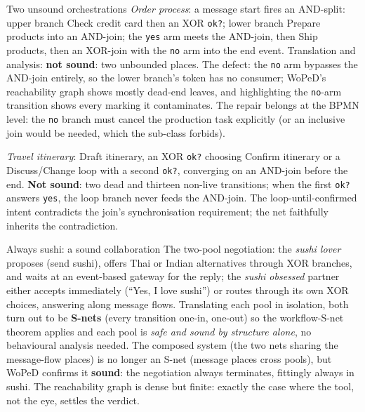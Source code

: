 \begin{examplebox}{Two unsound orchestrations}
\emph{Order process}: a message start fires an AND-split: upper branch \textsf{Check credit card} then an XOR \texttt{ok?}; lower branch \textsf{Prepare products} into an AND-join; the \texttt{yes} arm meets the AND-join, then \textsf{Ship products}, then an XOR-join with the \texttt{no} arm into the end event. Translation and analysis: \textbf{not sound}: two unbounded places. The defect: the \texttt{no} arm bypasses the AND-join entirely, so the lower branch's token has no consumer; WoPeD's reachability graph shows mostly dead-end leaves, and highlighting the \texttt{no}-arm transition shows every marking it contaminates. The repair belongs at the BPMN level: the \texttt{no} branch must cancel the production task explicitly (or an inclusive join would be needed, which the sub-class forbids).
\par\smallskip
\emph{Travel itinerary}: \textsf{Draft itinerary}, an XOR \texttt{ok?} choosing \textsf{Confirm itinerary} or a \textsf{Discuss/Change} loop with a second \texttt{ok?}, converging on an AND-join before the end. \textbf{Not sound}: two dead and thirteen non-live transitions; when the first \texttt{ok?} answers \texttt{yes}, the loop branch never feeds the AND-join. The loop-until-confirmed intent contradicts the join's synchronisation requirement; the net faithfully inherits the contradiction.
\end{examplebox}

\begin{examplebox}{Always sushi: a sound collaboration}
The two-pool negotiation: the \emph{sushi lover} proposes (\textsf{send sushi}), offers Thai or Indian alternatives through XOR branches, and waits at an event-based gateway for the reply; the \emph{sushi obsessed} partner either accepts immediately (``Yes, I love sushi'') or routes through its own XOR choices, answering along message flows. Translating each pool in isolation, both turn out to be \textbf{S-nets} (every transition one-in, one-out) so the workflow-S-net theorem applies and each pool is \emph{safe and sound by structure alone}, no behavioural analysis needed. The composed system (the two nets sharing the message-flow places) is no longer an S-net (message places cross pools), but WoPeD confirms it \textbf{sound}: the negotiation always terminates, fittingly always in sushi. The reachability graph is dense but finite: exactly the case where the tool, not the eye, settles the verdict.
\end{examplebox}

